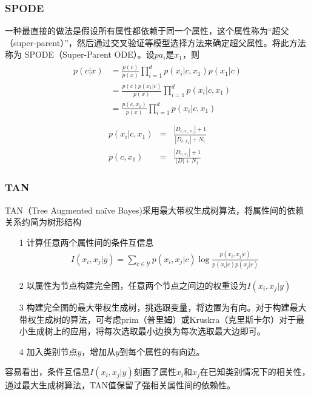 \subsubsection{SPODE}
一种最直接的做法是假设所有属性都依赖于同一个属性，这个属性称为“超父（super-parent）”，然后通过交叉验证等模型选择方法来确定超父属性。将此方法称为
SPODE（Super-Parent ODE）。设$pa_i$是$x_1$，则
\begin{eqnarray}
	\begin{aligned}
        	p(c|x)&=\frac{p(c)}{p(x)}\prod_{i=1}^dp(x_i|c,x_1)p(x_1|c)\\
                &=\frac{p(c)p(x_1|c)}{p(x)}\prod_{i=1}^dp(x_i|c,x_1)\\
		&=\frac{p(c,x_1)}{p(x)}\prod_{i=1}^dp(x_i|c,x_1)\\
	\end{aligned}	
\end{eqnarray}
\begin{eqnarray}
        p(x_i|c,x_1)&=&\frac{|D_{c,x_i,x_1}|+1}{|D_{c,x_1}|+N_i}\\
	p(c,x_1)&=&\frac{|D_{c,x_1}|+1}{|D|+N_1}	
\end{eqnarray}

\subsubsection{TAN}
TAN（Tree Augmented na\"ive Bayes)采用最大带权生成树算法，将属性间的依赖关系约简为树形结构
\begin{itemize}
\item[1] 计算任意两个属性间的条件互信息
\begin{eqnarray}
I(x_i,x_j|y)=\sum_{c\in \mathcal{Y}}p(x_i,x_j|c)\log\frac{p(x_i,x_j|c)}{p(x_i|c)p(x_j|c)}
\end{eqnarray}
\item[2] 以属性为节点构建完全图，任意两个节点之间边的权重设为$I(x_i,x_j|y)$
\item[3] 构建完全图的最大带权生成树，挑选跟变量，将边置为有向。对于构建最大带权生成树的算法，可考虑prim（普里姆）或Kruskra（克里斯卡尔）对于最小生成树上的应用，将每次选取最小边换为每次选取最大边即可。
\item[4] 加入类别节点$y$，增加从$y$到每个属性的有向边。
\end{itemize}
容易看出，条件互信息$I(x_i,x_j|y)$刻画了属性$x_i$和$x_j$在已知类别情况下的相关性，通过最大生成树算法，TAN值保留了强相关属性间的依赖性。

